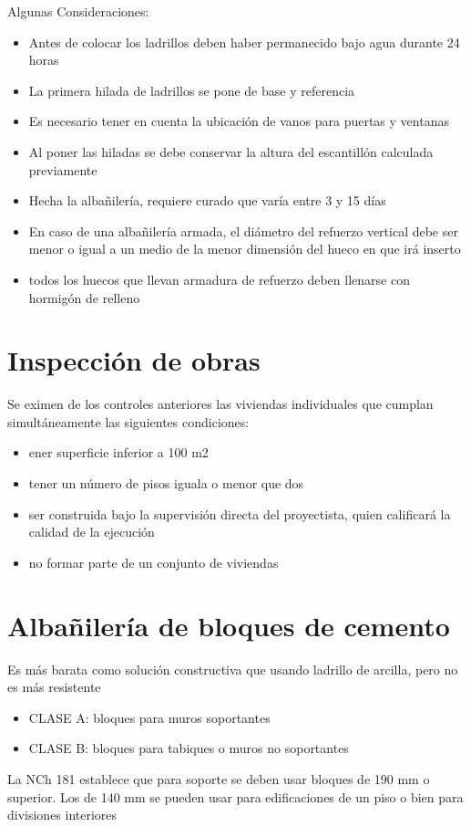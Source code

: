 Algunas Consideraciones:
\begin{itemize}
    \item Antes de colocar los ladrillos deben haber permanecido bajo agua durante 24 horas
    \item La primera hilada de ladrillos se pone de base y referencia
    \item Es necesario tener en cuenta la ubicación de vanos para puertas y ventanas
    \item Al poner las hiladas se debe conservar la altura del escantillón calculada previamente
    \item Hecha la albañilería, requiere curado que varía entre 3 y 15 días
    \item En caso de una albañilería armada, el diámetro del refuerzo vertical debe ser menor o igual a un medio de la menor dimensión del hueco en que irá inserto
    \item todos los huecos que llevan armadura de refuerzo deben llenarse con hormigón de relleno
\end{itemize}

\section{Inspección de obras}
Se eximen de los controles anteriores las viviendas individuales que cumplan simultáneamente las siguientes condiciones:
\begin{itemize}
    \item ener superficie inferior a 100 m2
    \item tener un número de pisos iguala o menor que dos
    \item ser construida bajo la supervisión directa del proyectista, quien calificará la calidad de la ejecución
    \item no formar parte de un conjunto de viviendas
\end{itemize}

\section{Albañilería de bloques de cemento}
Es más barata como solución constructiva que usando ladrillo de arcilla, pero no es más resistente
\begin{itemize}
    \item CLASE A: bloques para muros soportantes
    \item CLASE B: bloques para tabiques o muros no soportantes
\end{itemize}
La NCh 181 establece que para soporte se deben usar bloques de 190 mm o superior. Los de 140 mm se pueden usar para edificaciones de un piso o bien para divisiones interiores

